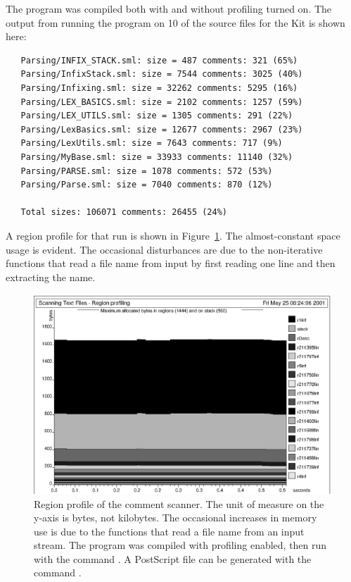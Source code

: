 \documentclass[12pt]{book}
\begin{document}
The program was compiled both with and without profiling turned on.
The output from running the program on 10 of the source files for the
Kit is shown here:
\begin{verbatim}
   Parsing/INFIX_STACK.sml: size = 487 comments: 321 (65%)
   Parsing/InfixStack.sml: size = 7544 comments: 3025 (40%)
   Parsing/Infixing.sml: size = 32262 comments: 5295 (16%)
   Parsing/LEX_BASICS.sml: size = 2102 comments: 1257 (59%)
   Parsing/LEX_UTILS.sml: size = 1305 comments: 291 (22%)
   Parsing/LexBasics.sml: size = 12677 comments: 2967 (23%)
   Parsing/LexUtils.sml: size = 7643 comments: 717 (9%)
   Parsing/MyBase.sml: size = 33933 comments: 11140 (32%)
   Parsing/PARSE.sml: size = 1078 comments: 572 (53%)
   Parsing/Parse.sml: size = 7040 comments: 870 (12%)

   Total sizes: 106071 comments: 26455 (24%)
\end{verbatim}
A region profile for that run is shown in Figure~\ref{scan.fig}.  The
almost-constant space usage is evident. The occasional disturbances
are due to the non-iterative functions that read a file name from
input by first reading one line and then extracting the name.
\begin{figure}
\begin{center}
\includegraphics{scan.ps}
\end{center}
\caption{Region profile of the comment scanner. The unit of measure on 
  the y-axis is bytes, not kilobytes. The occasional increases in
  memory use is due to the functions that read a file name from an
  input stream.  The program was compiled with profiling enabled, then
  run with the command . A PostScript file  can be
  generated with the command .  }
\label{scan.fig}
\end{figure}
\end{document}
